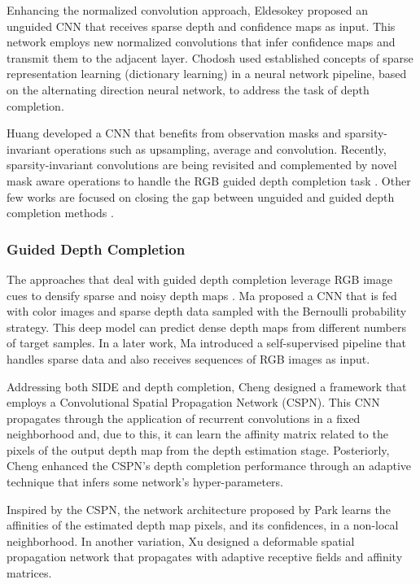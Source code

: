 \documentclass[5p]{elsarticle}
\begin{document}
Enhancing the normalized convolution approach, Eldesokey \etal \cite{eldesokey2019confidence} proposed an unguided CNN that receives sparse depth and confidence maps as input. This network employs new normalized convolutions that infer confidence maps and transmit them to the adjacent layer. Chodosh \etal \cite{chodosh2018deep} used established concepts of sparse representation learning (dictionary learning) in a neural network pipeline, based on the alternating direction neural network, to address the task of depth completion. 

Huang \etal \cite{huang2019hms} developed a CNN that benefits from observation masks and sparsity-invariant operations such as upsampling, average and convolution. Recently, sparsity-invariant convolutions \cite{uhrig2017sparsity} are being revisited and complemented by novel mask aware operations to handle the RGB guided depth completion task \cite{yan2020revisiting}. Other few works are focused on closing the gap between unguided and guided depth completion methods \cite{lu2020depth}.

\subsubsection{Guided Depth Completion}

The approaches that deal with guided depth completion leverage RGB image cues to densify sparse and noisy depth maps \cite{tang2019learning}. Ma \etal \cite{ma2018sparse} proposed a CNN that is fed with color images and sparse depth data sampled with the Bernoulli probability strategy. This deep model can predict dense depth maps from different numbers of target samples. In a later work, Ma \etal \cite{ma2019self} introduced a self-supervised pipeline that handles sparse data and also receives sequences of RGB images as input. 

Addressing both SIDE and depth completion, Cheng \etal \cite{cheng2018depth} designed a framework that employs a Convolutional Spatial Propagation Network (CSPN). This CNN propagates through the application of recurrent convolutions in a fixed neighborhood and, due to this, it can learn the affinity matrix related to the pixels of the output depth map from the depth estimation stage. Posteriorly, Cheng \etal \cite{cheng2019cspn++} enhanced the CSPN's depth completion performance through an adaptive technique that infers some network's hyper-parameters.

Inspired by the CSPN, the network architecture proposed by Park \etal \cite{park2020non} learns the affinities of the estimated depth map pixels, and its confidences, in a non-local neighborhood. In another variation, Xu \etal \cite{xu2020deformable} designed a deformable spatial propagation network that propagates with adaptive receptive fields and affinity matrices. 
\end{document}
